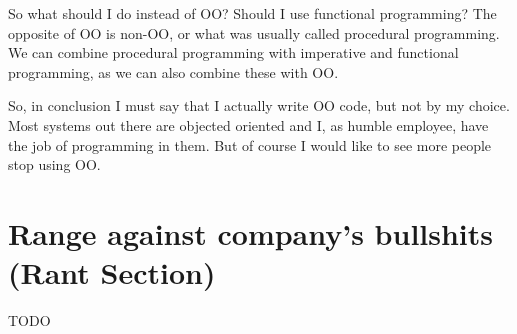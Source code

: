 \documentclass[11pt,a4paper,sans]{moderncv}
\begin{document}
So what should I do instead of OO?
Should I use functional programming?
The opposite of OO is non-OO, or what was usually called procedural programming.
We can combine procedural programming with imperative and functional programming, as we can also combine these with OO.

So, in conclusion I must say that I actually write OO code, but not by my choice.
Most systems out there are objected oriented and I, as humble employee, have the job of programming in them.
But of course I would like to see more people stop using OO.

\section{Range against company's bullshits (Rant Section)}
TODO
\end{document}
